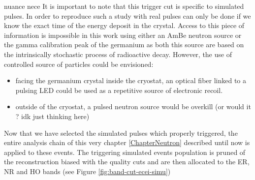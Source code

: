 {\color{red} nuance nece}
It is important to note that this trigger cut is specific to simulated pulses. In order to reproduce such a study with real pulses can only be done if we know the exact time of the energy deposit in the crystal. Access to this piece of information is impossible in this work using either an AmBe neutron source or the gamma calibration peak of the germanium as both this source are based on the intrinsically stochastic process of radioactive decay. However, the use of controlled source of particles could be envisioned:
\begin{itemize}
	\item facing the germanium crystal inside the cryostat, an optical fiber linked to a pulsing LED could be used as a repetitive source of electronic recoil.
	\item outside of the cryostat, a pulsed neutron source would be overkill (or would it ? idk just thinking here)
\end{itemize}

Now that we have selected the simulated pulses which properly triggered, the entire analysis chain of this very chapter \ref{ChapterNeutron} described until now is applied to these events. The triggering simulated events population is pruned of the reconstruction biased with the quality cuts and are then allocated to the ER, NR and HO bands (see Figure \ref{fig:band-cut-ecei-simu})
